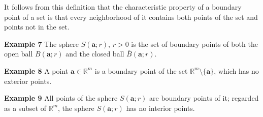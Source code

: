 It follows from this definition that the characteristic property of a boundary point
of a set is that every neighborhood of it contains both points of the set and points
not in the set.

\textbf{Example 7} The sphere $S(\mathbf{a}; r)$, $r > 0$ is the set of boundary points of both the open
ball $B(\mathbf{a}; r)$ and the closed ball $\overline{B}(\mathbf{a}; r)$.

\textbf{Example 8} A point $\mathbf{a} \in \mathbb{R}^m$ is a boundary point of the set $\mathbb{R}^m \setminus \{\mathbf{a}\}$, which has no
exterior points.

\textbf{Example 9} All points of the sphere $S(\mathbf{a}; r)$ are boundary points of it; regarded as a
subset of $\mathbb{R}^m$, the sphere $S(\mathbf{a}; r)$ has no interior points.